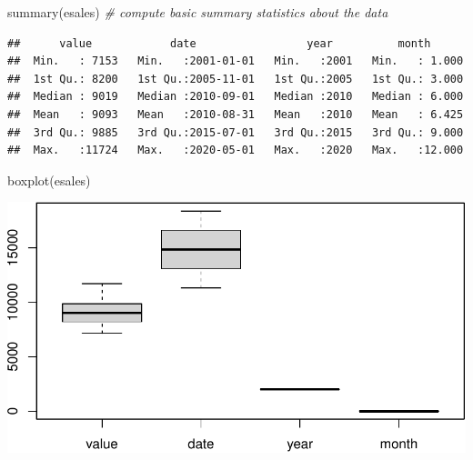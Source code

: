 \documentclass[
]{book}
\newenvironment{Shaded}{\begin{snugshade}}{\end{snugshade}}
\newcommand{\AttributeTok}[1]{\textcolor[rgb]{0.77,0.63,0.00}{#1}}
\newcommand{\CommentTok}[1]{\textcolor[rgb]{0.56,0.35,0.01}{\textit{#1}}}
\newcommand{\DecValTok}[1]{\textcolor[rgb]{0.00,0.00,0.81}{#1}}
\newcommand{\FunctionTok}[1]{\textcolor[rgb]{0.00,0.00,0.00}{#1}}
\newcommand{\NormalTok}[1]{#1}
\newcommand{\SpecialCharTok}[1]{\textcolor[rgb]{0.00,0.00,0.00}{#1}}
\begin{document}
\begin{Shaded}
\begin{Highlighting}[]
\FunctionTok{summary}\NormalTok{(esales)  }\CommentTok{\# compute basic summary statistics about the data}
\end{Highlighting}
\end{Shaded}

\begin{verbatim}
##      value            date                 year          month       
##  Min.   : 7153   Min.   :2001-01-01   Min.   :2001   Min.   : 1.000  
##  1st Qu.: 8200   1st Qu.:2005-11-01   1st Qu.:2005   1st Qu.: 3.000  
##  Median : 9019   Median :2010-09-01   Median :2010   Median : 6.000  
##  Mean   : 9093   Mean   :2010-08-31   Mean   :2010   Mean   : 6.425  
##  3rd Qu.: 9885   3rd Qu.:2015-07-01   3rd Qu.:2015   3rd Qu.: 9.000  
##  Max.   :11724   Max.   :2020-05-01   Max.   :2020   Max.   :12.000
\end{verbatim}

\begin{Shaded}
\begin{Highlighting}[]
\FunctionTok{boxplot}\NormalTok{(esales)}
\end{Highlighting}
\end{Shaded}

\includegraphics{graphics/make basic data summaries-1.pdf}

\begin{Shaded}
\end{Shaded}
\end{document}
